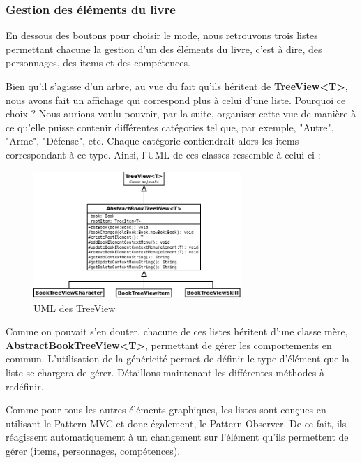 			\subsubsection{Gestion des éléments du livre}

				En dessous des boutons pour choisir le mode, nous retrouvons trois listes permettant chacune la gestion d'un des éléments du livre, c'est à dire, des personnages, des items et des compétences.

				Bien qu'il s'agisse d'un arbre, au vue du fait qu'ils héritent de \textbf{TreeView<T>}, nous avons fait un affichage qui correspond plus à celui d'une liste. Pourquoi ce choix ? Nous aurions voulu pouvoir, par la suite, organiser cette vue de manière à ce qu'elle puisse contenir différentes catégories tel que, par exemple, "Autre", "Arme", "Défense", etc. Chaque catégorie contiendrait alors les items correspondant à ce type. Ainsi, l'UML de ces classes ressemble à celui ci :

				\begin{figure}[H]
					\centering\includegraphics[width=0.7\textwidth]{img/fenetreTreeView.png}
					\caption{UML des TreeView}
					\label{fig:fenetreTreeView}
				\end{figure}

				Comme on pouvait s'en douter, chacune de ces listes héritent d'une classe mère, \textbf{AbstractBookTreeView<T>}, permettant de gérer les comportements en commun. L'utilisation de la généricité permet de définir le type d'élément que la liste se chargera de gérer. Détaillons maintenant les différentes méthodes à redéfinir.

				Comme pour tous les autres éléments graphiques, les listes sont conçues en utilisant le Pattern MVC et donc également, le Pattern Observer. De ce fait, ils réagissent automatiquement à un changement sur l'élément qu'ils permettent de gérer (items, personnages, compétences).

